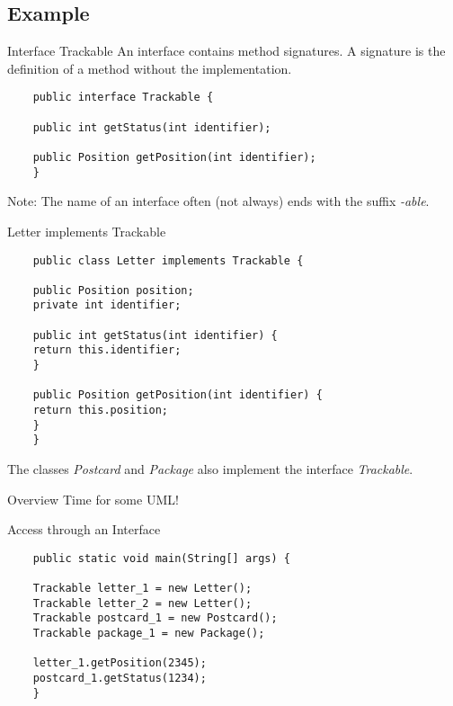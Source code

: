 \subsection{Example}
\begin{frame}[fragile]{Interface Trackable}
	An interface contains method signatures. A signature is the definition of a method without the implementation.
	\begin{lstlisting}
	public interface Trackable {
	
	public int getStatus(int identifier);
	
	public Position getPosition(int identifier);
	}
	\end{lstlisting}
	Note: The name of an interface often (not always) ends with the suffix \emph{-able}.
\end{frame}
\begin{frame}[fragile]{Letter implements Trackable}
	\begin{lstlisting}
	public class Letter implements Trackable {
	
	public Position position;
	private int identifier;
	
	public int getStatus(int identifier) {
	return this.identifier;
	}
	
	public Position getPosition(int identifier) {
	return this.position;
	}
	}
	\end{lstlisting}
	The classes \emph{Postcard} and \emph{Package} also implement the interface \emph{Trackable}.
\end{frame}

\begin{frame}[fragile]{Overview}
	\huge Time for some UML!
\end{frame}

\begin{frame}[fragile]{Access through an Interface}
	\begin{lstlisting}
	public static void main(String[] args) {
	
	Trackable letter_1 = new Letter();
	Trackable letter_2 = new Letter();
	Trackable postcard_1 = new Postcard();
	Trackable package_1 = new Package();
	
	letter_1.getPosition(2345);
	postcard_1.getStatus(1234);
	}
	\end{lstlisting}
\end{frame}

